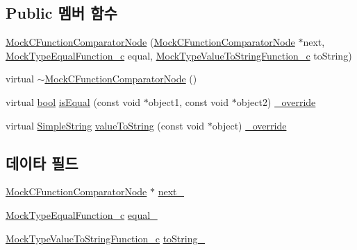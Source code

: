 \subsection*{Public 멤버 함수}
\begin{DoxyCompactItemize}
\item 
\hyperlink{class_mock_c_function_comparator_node_a028b4f2d79ee45bdb5d935fb4bd334bf}{Mock\+C\+Function\+Comparator\+Node} (\hyperlink{class_mock_c_function_comparator_node}{Mock\+C\+Function\+Comparator\+Node} $\ast$next, \hyperlink{_mock_support__c_8h_aa5b0cfdc4f4768baad91eb470305c0ff}{Mock\+Type\+Equal\+Function\+\_\+c} equal, \hyperlink{_mock_support__c_8h_add0b6832f7adeee2cd41537c2c69b388}{Mock\+Type\+Value\+To\+String\+Function\+\_\+c} to\+String)
\item 
virtual \hyperlink{class_mock_c_function_comparator_node_a8ec72ef51ed4b400607d302aed15056f}{$\sim$\+Mock\+C\+Function\+Comparator\+Node} ()
\item 
virtual \hyperlink{avb__gptp_8h_af6a258d8f3ee5206d682d799316314b1}{bool} \hyperlink{class_mock_c_function_comparator_node_a43937ecaa593cc2c35079e5a2347bea9}{is\+Equal} (const void $\ast$object1, const void $\ast$object2) \hyperlink{_cpp_u_test_config_8h_a049bea15dd750e15869863c94c1efc3b}{\+\_\+override}
\item 
virtual \hyperlink{class_simple_string}{Simple\+String} \hyperlink{class_mock_c_function_comparator_node_ac235f39dbc7ebfe1ab569482258dd450}{value\+To\+String} (const void $\ast$object) \hyperlink{_cpp_u_test_config_8h_a049bea15dd750e15869863c94c1efc3b}{\+\_\+override}
\end{DoxyCompactItemize}
\subsection*{데이타 필드}
\begin{DoxyCompactItemize}
\item 
\hyperlink{class_mock_c_function_comparator_node}{Mock\+C\+Function\+Comparator\+Node} $\ast$ \hyperlink{class_mock_c_function_comparator_node_aa3f9159b348e2deda993f12a5b228a35}{next\+\_\+}
\item 
\hyperlink{_mock_support__c_8h_aa5b0cfdc4f4768baad91eb470305c0ff}{Mock\+Type\+Equal\+Function\+\_\+c} \hyperlink{class_mock_c_function_comparator_node_aacdd74d81e66b1db05ee30f4486342dd}{equal\+\_\+}
\item 
\hyperlink{_mock_support__c_8h_add0b6832f7adeee2cd41537c2c69b388}{Mock\+Type\+Value\+To\+String\+Function\+\_\+c} \hyperlink{class_mock_c_function_comparator_node_ac764fee99195597a2b3a8e2a2d322994}{to\+String\+\_\+}
\end{DoxyCompactItemize}


